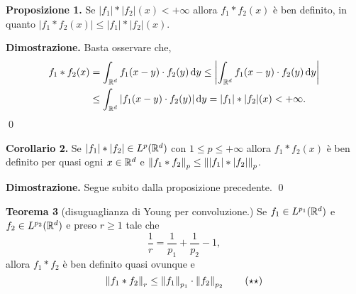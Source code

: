 %
%


\textbf{Proposizione 1.}
Se $|f_1| \ast |f_2| (x) < +\infty$ allora $f_1 \ast f_2(x)$ è ben definito, in quanto $|f_1 \ast f_2(x)| \leq |f_1| \ast |f_2|(x)$.

\textbf{Dimostrazione.}
Basta osservare che,
%
\begin{align*}
f_1 \ast f_2(x) & = \int_{\mathbb R^d} f_1(x-y) \cdot f_2(y) \,\mathrm{d} y 
\leq \left| \int_{\mathbb R^d} f_1(x-y) \cdot f_2(y) \,\mathrm{d} y \right| \\
& \leq \int_{\mathbb R^d} |f_1(x-y) \cdot f_2(y)| \,\mathrm{d} y
= |f_1| \ast |f_2|(x) < +\infty.
\end{align*}
\qed

\textbf{Corollario 2.}
Se $|f_1| \ast |f_2| \in L^p(\mathbb R^d)$ con $1 \leq p \leq +\infty$ allora $f_1 \ast f_2(x)$ è ben definito per quasi ogni $x \in \mathbb R^d$ e $\left\lVert f_1 \ast f_2 \right\rVert_p \leq \left\lVert |f_1| \ast |f_2| \right\rVert_p$.

\textbf{Dimostrazione.}
Segue subito dalla proposizione precedente.
\qed

\textbf{Teorema 3} (disuguaglianza di Young per convoluzione.)
Se $f_1 \in L^{p_1}(\mathbb R^d)$ e $f_2 \in L^{p_2}(\mathbb R^d)$ e preso $r \geq 1$ tale che
\begin{equation}\label{eqn:conv_th3_cond}
	\frac{1}{r} = \frac{1}{p_1} + \frac{1}{p_2} - 1,
	\tag{$\star$}
\end{equation}
allora $f_1 \ast f_2$ è ben definito quasi ovunque e
\begin{equation}\label{eqn:conv_th3_thesis}
	\left\lVert f_1 \ast f_2 \right\rVert_r \leq \left\lVert f_1 \right\rVert_{p_1} \cdot \left\lVert f_2 \right\rVert_{p_2}
	\tag{$\star\star$}
\end{equation}

